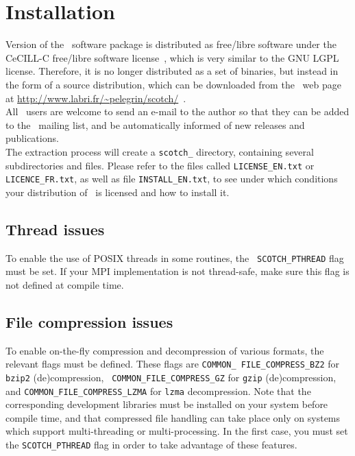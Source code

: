 
\section{Installation}
\label{sec-install}

Version {\sc \scotchver} of the \scotch\ software package is
distributed as free/libre software under the CeCILL-C free/libre
software license~\cite{cecill}, which is very similar to the GNU LGPL
license. Therefore, it is no longer distributed as a set of binaries,
but instead in the form of a source distribution, which can be
downloaded from the \scotch\ web page at
\url{http://www.labri.fr/~pelegrin/scotch/}~.
\\

All \scotch\ users are welcome to send an e-mail to the author so that
they can be added to the \scotch\ mailing list, and be automatically
informed of new releases and publications.
\\

The extraction process will create a {\tt scotch\_\scotchversub}
directory, containing several subdirectories and files. Please refer
to the files called {\tt LICENSE\_\lbt EN.txt} or
{\tt LICENCE\_\lbt FR.txt}, as well as file
{\tt INSTALL\_\lbt EN.txt}, to see under which conditions your
distribution of \scotch\ is licensed and how to install it.

\subsection{Thread issues}

To enable the use of POSIX threads in some routines, the {\tt
SCOTCH\_\lbt PTHREAD} flag must be set. If your MPI implementation is
not thread-safe, make sure this flag is not defined at compile time.

\subsection{File compression issues}

To enable on-the-fly compression and decompression of various formats,
the relevant flags must be defined. These flags are {\tt COMMON\_\lbt
FILE\_\lbt COMPRESS\_\lbt BZ2} for {\tt bzip2} (de)compression, {\tt
COMMON\_\lbt FILE\_\lbt COMPRESS\_\lbt GZ} for {\tt gzip}
(de)compression, and {\tt COMMON\_\lbt FILE\_\lbt COMPRESS\_\lbt LZMA}
for {\tt lzma} decompression. Note that the corresponding
development libraries must be installed on your system before compile
time, and that compressed file handling can take place only on systems
which support multi-threading or multi-processing. In the first case,
you must set the {\tt SCOTCH\_\lbt PTHREAD} flag in order to take
advantage of these features.

